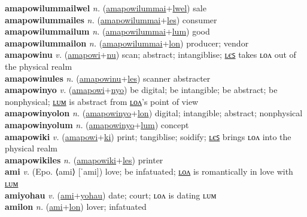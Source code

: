 \textbf{amapowilummailwel} \textit{n.} (\hyperref[amapowilummai]{amapowilummai}+\hyperref[lwel]{lwel})
sale \label{amapowilummailwel} \\
\textbf{amapowilummailes} \textit{n.} (\hyperref[amapowilummai]{amapowilummai}+\hyperref[les]{les})
consumer \label{amapowilummailes} \\
\textbf{amapowilummailum} \textit{n.} (\hyperref[amapowilummai]{amapowilummai}+\hyperref[lum]{lum})
good \label{amapowilummailum} \\
\textbf{amapowilummailon} \textit{n.} (\hyperref[amapowilummai]{amapowilummai}+\hyperref[lon]{lon})
producer; vendor \label{amapowilummailon} \\
\textbf{amapowinu} \textit{v.} (\hyperref[amapowi]{amapowi}+\hyperref[nu]{nu})
scan; abstract; intangiblise; \hyperref[amapowinules]{ʟєꜱ} takes ʟᴏᴧ out of the physical realm \label{amapowinu} \\
\textbf{amapowinules} \textit{n.} (\hyperref[amapowinu]{amapowinu}+\hyperref[les]{les})
scanner abstracter \label{amapowinules} \\
\textbf{amapowinyo} \textit{v.} (\hyperref[amapowi]{amapowi}+\hyperref[nyo]{nyo})
be digital; be intangible; be abstract; be nonphysical; \hyperref[amapowinyolum]{ʟᴜᴍ} is abstract from \hyperref[amapowinyolon]{ʟᴏᴧ}’s point of view \label{amapowinyo} \\
\textbf{amapowinyolon} \textit{n.} (\hyperref[amapowinyo]{amapowinyo}+\hyperref[lon]{lon})
digital; intangible; abstract; nonphysical \label{amapowinyolon} \\
\textbf{amapowinyolum} \textit{n.} (\hyperref[amapowinyo]{amapowinyo}+\hyperref[lum]{lum})
concept \label{amapowinyolum} \\
\textbf{amapowiki} \textit{v.} (\hyperref[amapowi]{amapowi}+\hyperref[ki]{ki})
print; tangiblise; soidify; \hyperref[amapowikiles]{ʟєꜱ} brings ʟᴏᴧ into the physical realm \label{amapowiki} \\
\textbf{amapowikiles} \textit{n.} (\hyperref[amapowiki]{amapowiki}+\hyperref[les]{les})
printer \label{amapowikiles} \\
\textbf{ami} \textit{v.} (Epo. ⟨ami⟩ [ˈami])
love; be infatuated; \hyperref[amilon]{ʟᴏᴧ} is romantically in love with \hyperref[amilum]{ʟᴜᴍ} \label{ami} \\
\textbf{amiyohau} \textit{v.} (\hyperref[ami]{ami}+\hyperref[yohau]{yohau})
date; court; ʟᴏᴧ is dating ʟᴜᴍ \label{amiyohau} \\
\textbf{amilon} \textit{n.} (\hyperref[ami]{ami}+\hyperref[lon]{lon})
lover; infatuated \label{amilon} \\
